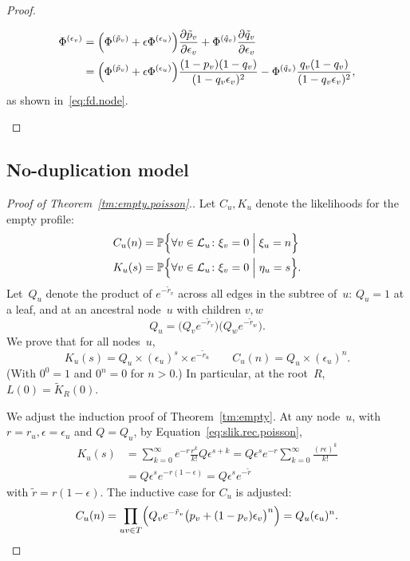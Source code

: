 \documentclass{elsarticle}
\newcommand{\condgen}[6]{{#1}#2 #5 #3 #6 #4}
\newcommand{\PROB}{\mathbb{P}}
\newcommand{\Probcmd}[2]{\condgen{\PROB}{\Bigl\{}{\Bigm|}{\Bigr\}}{#1}{#2}}
\newcommand{\nlik}{C}
\newcommand{\slik}{K}
\newcommand{\nx}{u}
\newcommand{\ny}{v}
\newcommand{\nz}{w}
\newcommand{\fdf}{\Phi}
\begin{document}
\begin{proof}
\begin{enumerate}[label=(\roman*)]
\begin{align*}
\fdf^{(\epsilon_{\ny})}
	& = \Bigl(\fdf^{(\tilde{p}_{\ny})}
	+ \epsilon \fdf^{(\epsilon_{\nx})}\Bigr)
	 \frac{\partial \tilde{p}_{\ny}}{\partial \epsilon_{\ny}} 
	 +\fdf^{(\tilde{q}_{\ny})} 
		\frac{\partial \tilde{q}_{\ny}}{\partial \epsilon_{\ny}}
\\
& = 
	\Bigl(\fdf^{(\tilde{p}_{\ny})}
	+ \epsilon \fdf^{(\epsilon_{\nx})}\Bigr)
		\frac{(1-p_{\ny})(1-q_{\ny})}{(1-q_{\ny}\epsilon_{\ny})^2}		
	- \fdf^{(\tilde{q}_{\ny})}
		\frac{q_{\ny}(1-q_{\ny})}{(1-q_{\ny}\epsilon_{\ny})^2},
\end{align*}
as shown in~\eqref{eq:fd.node}.
\end{enumerate}
\end{proof}





\subsection{No-duplication model}
\begin{proof}[Proof of Theorem~\ref{tm:empty.poisson}.]
Let $\nlik_{\nx},\slik_{\nx}$ denote the likelihoods 
for the empty profile: 
\begin{align*}
\nlik_{\nx}(n) & = \Probcmd{\forall \ny\in \mathcal{L}_{\nx} \colon \xi_{\ny}=0}{\xi_{\nx}=n}
\\
\slik_{\nx}(s) &= \Probcmd{\forall \ny \in \mathcal{L}_{\nx} \colon \xi_{\ny}=0}{\eta_{\nx}=s}.
\end{align*}
Let~$Q_{\nx}$ denote the product of $e^{-\tilde{r}_{\ny}}$
across all edges in the subtree of~$\nx$:
$Q_{\nx}=1$ at a leaf, and at an ancestral node~$\nx$
with children $\ny,\nz$
\[
Q_{\nx} = \bigl(Q_{\ny} e^{-\tilde{r}_{\ny}}\bigr)
	\bigl(Q_{\nz} e^{-\tilde{r}_{\nz}}\bigr).
\] 
We prove that 
for all nodes~$\nx$,
\[
\slik_{\nx}(s) = Q_{\nx} \times (\epsilon_{\nx})^s \times e^{-\tilde{r}_{\nx}}
\qquad
\nlik_{\nx}(n) = Q_{\nx} \times (\epsilon_{\nx})^n.
\]
(With $0^0=1$ and $0^n=0$ for $n>0$.)
In particular, at the root~$R$, $L(0)=\tilde{\slik}_R(0)$. 

We adjust the induction proof of Theorem~\ref{tm:empty}.  
At any node~$\nx$, with $r=r_{\nx}, \epsilon=\epsilon_{\nx}$ and $Q=Q_{\nx}$, 
by Equation~\eqref{eq:slik.rec.poisson},
\begin{align*}
\slik_{\nx}(s) & = \sum_{k=0}^{\infty} e^{-r}\frac{r^k}{k!} Q \epsilon^{s+k}
 = Q \epsilon^s e^{-r} \sum_{k=0}^{\infty} \frac{(r\epsilon)^k}{k!}
 \\ 
 & = Q \epsilon^s e^{-r(1-\epsilon)} = Q\epsilon^s e^{-\tilde{r}}
\end{align*}
with $\tilde{r}=r(1-\epsilon)$. 
The inductive case for $\nlik_{\nx}$ is adjusted:
\[
\nlik_{\nx} (n) = \prod_{\nx\ny\in T} \Bigl( Q_{\ny} e^{-\tilde{r}_{\ny}}\bigl(p_{\ny}+(1-p_{\ny})\epsilon_{\ny}\bigr)^n\Bigr)
 = Q_{\nx} (\epsilon_{\nx})^n.
\]
\end{proof}
\end{document}

